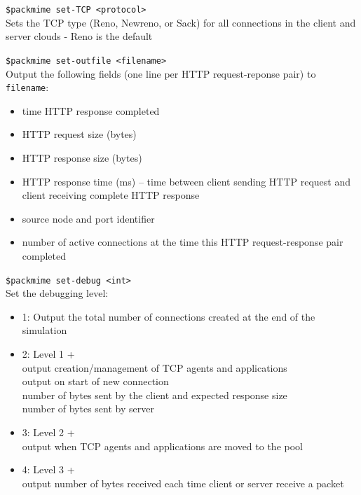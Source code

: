 {\tt \$packmime set-TCP <protocol>}\\
Sets the TCP type (Reno, Newreno, or Sack) for all connections in the
client and server clouds - Reno is the default

{\tt \$packmime set-outfile <filename>}\\
Output the following fields (one line per HTTP request-reponse pair)
to {\tt filename}:
\begin{itemize}
\item{time HTTP response completed}
\item{HTTP request size (bytes)}
\item{HTTP response size (bytes)}
\item{HTTP response time (ms) -- time between client sending HTTP
request and client receiving complete HTTP response} 
\item{source node and port identifier}
\item{number of active connections at the time this HTTP
request-response pair completed}
\end{itemize}

{\tt \$packmime set-debug <int>}\\
Set the debugging level:
\begin{itemize}
\item{1: Output the total number of connections created at the end of
the simulation}
\item{2: Level 1 + \\
output creation/management of TCP agents and applications\\
output on start of new connection\\
number of bytes sent by the client and expected response size\\
number of bytes sent by server}
\item{3: Level 2 + \\
output when TCP agents and applications are moved to the pool}
\item{4: Level 3 + \\
output number of bytes received each time client or server receive a packet}
\end{itemize}



